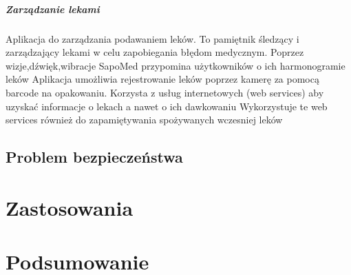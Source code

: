 \paragraph{Zarządzanie lekami\\}
 Aplikacja do zarządzania podawaniem leków. To pamiętnik śledzący i zarządzający lekami w celu zapobiegania błędom medycznym. 
 Poprzez wizje,dźwięk,wibracje  SapoMed przypomina użytkowników o ich harmonogramie leków
 Aplikacja umożliwia rejestrowanie leków poprzez kamerę za pomocą barcode na opakowaniu. 
 Korzysta z usług internetowych (web services) aby uzyskać informacje o lekach a nawet o ich dawkowaniu
 Wykorzystuje te web services również do zapamiętywania spożywanych wczesniej leków 
\section{Problem bezpieczeństwa}
\chapter{Zastosowania}
\chapter{Podsumowanie}